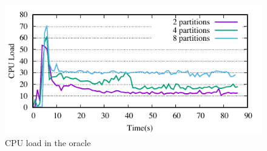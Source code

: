 \begin{figure}[ht]
	\includegraphics{figures/experiments/oracle-load}
	\caption{CPU load in the oracle}
	\label{fig:cpu_oracle}
\end{figure}

